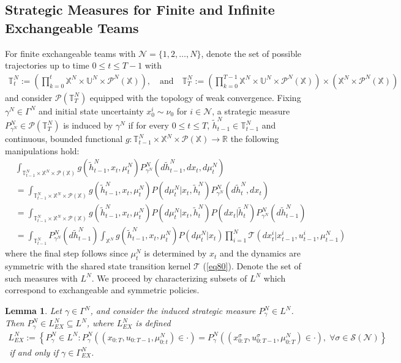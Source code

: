 \documentclass[12pt, oneside]{report}
\newcommand{\mbb}[1]{\mathbb{#1}}
\newcommand{\1}[1]{\mathbbm{1}_{\{#1\}}}
\newcommand{\mc}[1]{\mathcal{#1}}
\newtheorem{lemma}[theorem]{Lemma}
\theoremstyle{definition}
\begin{document}
\subsection{Strategic Measures for Finite and Infinite Exchangeable Teams}
For finite exchangeable teams with $\mc{N}=\{1,2,\dots,N\}$, denote the set of
possible trajectories up to time $0\leq t\leq T-1$ with
\begin{align}
    \mbb{T}^N_t:=\left(\prod_{k=0}^{t}\mbb{X}^N\times\mbb{U}^N\times\mc{P}^N(\mbb{X})\right),\quad\text{and}\quad\mbb{T}^N_T:=\left(\prod_{k=0}^{T-1}\mbb{X}^N\times\mbb{U}^N\times\mc{P}^N(\mbb{X})\right)\times(\mbb{X}^N\times\mc{P}^N(\mbb{X}))
\end{align}
and consider $\mc{P}(\mbb{T}^N_T)$ equipped with the topology of weak convergence.
Fixing $\gamma^N\in\Gamma^N$ and initial state uncertainty $x^i_0\sim\nu_0$ for
$i\in\mc{N}$, a strategic measure $P^N_{\gamma^N}\in\mc{P}(\mbb{T}^N_T)$ is induced by
$\gamma^N$ if for every $0\leq t\leq T$, $\widetilde{h}^N_{t-1}\in\mbb{T}^N_{t-1}$
and continuous, bounded functional
$g:\mbb{T}^N_{t-1}\times\mbb{X}^N\times\mc{P}(\mbb{X})\rightarrow\mbb{R}$ the following manipulations hold:
\begin{align*}
    &\int_{\mbb{T}^N_{t-1}\times\mbb{X}^N\times\mc{P}(\mbb{X})} g(\widetilde{h}^N_{t-1},x_t,\mu^N_t)P^N_{\gamma^N}(d\widetilde{h}^N_{t-1},dx_t,d\mu^N_t)\\
    &=\int_{\mbb{T}^N_{t-1}\times\mbb{X}^N\times\mc{P}(\mbb{X})}g(\widetilde{h}^N_{t-1},x_t,\mu^N_t)P(d\mu^N_t|x_t,\widetilde{h}^N_t)P^N_{\gamma^N}(d\widetilde{h}^N_t,dx_t) \\
    &=\int_{\mbb{T}^N_{t-1}\times\mbb{X}^N\times\mc{P}(\mbb{X})}g(\widetilde{h}^N_{t-1},x_t,\mu^N_t)P(d\mu^N_t|x_t,\widetilde{h}^N_t)P(dx_t|\widetilde{h}^N_t)P^N_{\gamma^N}(d\widetilde{h}^N_{t-1})\\
    &=\int_{\mbb{T}^N_{t-1}}P^N_{\gamma^N}(d\widetilde{h}^N_{t-1})\int_{\mbb{X}^N}g(\widetilde{h}^N_{t-1},x_t,\mu^N_t)P(d\mu^N_t|x_t)\prod_{i=1}^N\mc{T}(dx^i_t|x^i_{t-1},u^i_{t-1},\mu^N_{t-1})
\end{align*}
where the final step follows since $\mu^N_t$ is determined by $x_t$ and the dynamics are symmetric with the shared state transition kernel $\mc{T}$ (\ref{eq80}). Denote the set of such measures with
$L^N$. We proceed by characterizing subsets of $L^N$ which correspond to exchangeable and symmetric policies.
\begin{lemma}\label{lem3}
Let $\gamma\in\Gamma^N$, and consider the induced strategic measure $P^N_{\gamma}\in L^N$. Then $P^N_\gamma\in L^N_{EX}\subseteq L^N$, where $L^N_{EX}$ is defined
\begin{align}
    L^N_{EX}:=\left\{P^N_{\gamma}\in L^N:P^N_\gamma((x_{0:T},u_{0:T-1},\mu^N_{0:t})\in\cdot)=P^N_\gamma((x^\sigma_{0:T},u_{0:T-1}^\sigma,\mu^N_{0:T})\in\cdot),\;\forall\sigma\in\mc{S}(\mc{N})\right\}
\end{align} \
if and only if $\gamma\in\Gamma^N_{EX}$.
\end{lemma}
\end{document}
